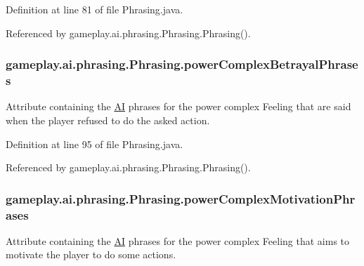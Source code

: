 Definition at line 81 of file Phrasing.\-java.



Referenced by gameplay.\-ai.\-phrasing.\-Phrasing.\-Phrasing().

\hypertarget{a00018_a77e67b74525c919463d3c9b830fe895d}{
\subsubsection[{power\-Complex\-Betrayal\-Phrases}]{ gameplay.\-ai.\-phrasing.\-Phrasing.\-power\-Complex\-Betrayal\-Phrases\hspace{0.3cm}{\ttfamily [protected]}}}\label{a00018_a77e67b74525c919463d3c9b830fe895d}


Attribute containing the \hyperlink{a00001}{A\-I} phrases for the power complex Feeling that are said when the player refused to do the asked action. 



Definition at line 95 of file Phrasing.\-java.



Referenced by gameplay.\-ai.\-phrasing.\-Phrasing.\-Phrasing().

\hypertarget{a00018_ad566ad78166872e95e920833f4f36e90}{
\subsubsection[{power\-Complex\-Motivation\-Phrases}]{ gameplay.\-ai.\-phrasing.\-Phrasing.\-power\-Complex\-Motivation\-Phrases\hspace{0.3cm}{\ttfamily [protected]}}}\label{a00018_ad566ad78166872e95e920833f4f36e90}


Attribute containing the \hyperlink{a00001}{A\-I} phrases for the power complex Feeling that aims to motivate the player to do some actions. 



